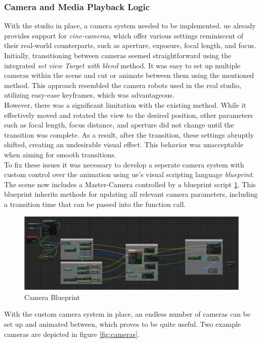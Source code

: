 \documentclass[
  a4paper,  %
  twoside,  %
  bibliography=totoc,
  headsepline,
  cleardoublepage=empty,
  parskip=half,
  draft=false
]{scrbook}
\begin{document}
\subsubsection*{Camera and Media Playback Logic} 
With the studio in place, a camera system needed to be implemented. \gls{ue} already provides support for \textit{cine-cameras}, which offer various settings reminiscent of their real-world counterparts, such as aperture, exposure, focal length, and focus. Initially, transitioning between cameras seemed straightforward using the integrated \textit{set view Target with blend} method. It was easy to set up multiple cameras within the scene and cut or animate between them using the mentioned method. This approach resembled the camera robots used in the real studio, utilizing easy-ease keyframes, which was advantageous. \\
However, there was a significant limitation with the existing method. While it effectively moved and rotated the view to the desired position, other parameters such as focal length, focus distance, and aperture did not change until the transition was complete. As a result, after the transition, these settings abruptly shifted, creating an undesirable visual effect. This behavior was unacceptable when aiming for smooth transitions. \\
To fix these issues it was necessary to develop a seperate camera system with custom control over the animation using \gls{ue}'s visual scripting language \textit{blueprint}. The scene now includes a Master-Camera controlled by a blueprint script \ref{fig:blueprint}. This blueprint inherits methods for updating all relevant camera parameters, including a transition time that can be passed into the function call.
\begin{figure}[h]
  \centering
  \includegraphics[width=1\textwidth]{graphics/images/unreal-engine/blueprint.png}
  \caption{Camera Blueprint}
  \label{fig:blueprint}
\end{figure}
With the custom camera system in place, an endless number of cameras can be set up and animated between, which proves to be quite useful. Two example cameras are depicted in figure \ref{fig:cameras}.
\end{document}
